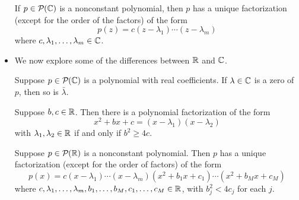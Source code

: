\documentclass[../main.tex]{subfiles}
\begin{document}
\begin{itemize}
    \begin{theorem}\label{trm:polFactorization}
        If $p\in\mathcal{P}_{}(\mathbb{C})$ is a nonconstant polynomial, then $p$ has a unique factorization (except for the order of the factors) of the form
        \begin{equation*}
            p(z) = c(z-\lambda_1)\cdots(z-\lambda_m)
        \end{equation*}
        where $c,\lambda_1,\dots,\lambda_m\in\mathbb{C}$.
    \end{theorem}
    \item We now explore some of the differences between $\mathbb{R}$ and $\mathbb{C}$.
    \begin{theorem}
        Suppose $p\in\mathcal{P}_{}(\mathbb{C})$ is a polynomial with real coefficients. If $\lambda\in\mathbb{C}$ is a zero of $p$, then so is $\bar{\lambda}$.
    \end{theorem}
    \begin{theorem}
        Suppose $b,c\in\mathbb{R}$. Then there is a polynomial factorization of the form
        \begin{equation*}
            x^2+bx+c = (x-\lambda_1)(x-\lambda_2)
        \end{equation*}
        with $\lambda_1,\lambda_2\in\mathbb{R}$ if and only if $b^2\geq 4c$.
    \end{theorem}
    \begin{theorem}
        Suppose $p\in\mathcal{P}_{}(\mathbb{R})$ is a nonconstant polynomial. Then $p$ has a unique factorization (except for the order of factors) of the form
        \begin{equation*}
            p(x) = c(x-\lambda_1)\cdots(x-\lambda_m)(x^2+b_1x+c_1)\cdots(x^2+b_Mx+c_M)
        \end{equation*}
        where $c,\lambda_1,\dots,\lambda_m,b_1,\dots,b_M,c_1,\dots,c_M\in\mathbb{R}$, with $b_j^2<4c_j$ for each $j$.
    \end{theorem}
\end{itemize}
\end{document}
